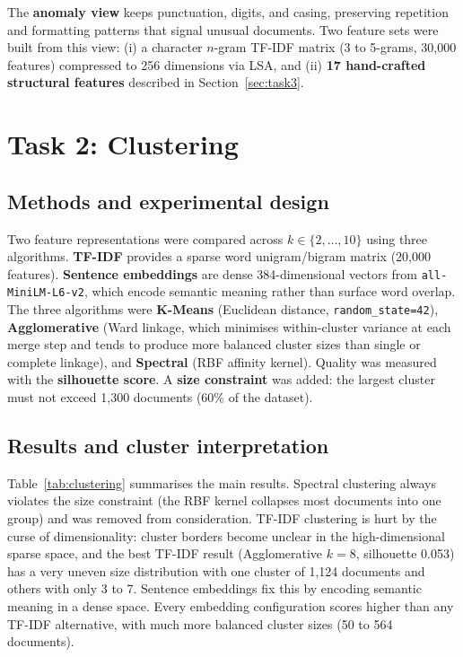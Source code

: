 \documentclass[11pt,a4paper]{article}
\begin{document}
The \textbf{anomaly view} keeps punctuation, digits, and casing, preserving repetition and formatting patterns that signal unusual documents. Two feature sets were built from this view: (i) a character $n$-gram TF-IDF matrix (3 to 5-grams, 30,000 features) compressed to 256 dimensions via LSA, and (ii) \textbf{17 hand-crafted structural features} described in Section~\ref{sec:task3}.

\section{Task 2: Clustering}
\label{sec:task2}

\subsection{Methods and experimental design}

Two feature representations were compared across $k \in \{2, \ldots, 10\}$ using three algorithms. \textbf{TF-IDF} provides a sparse word unigram/bigram matrix (20,000 features). \textbf{Sentence embeddings} are dense 384-dimensional vectors from \texttt{all-MiniLM-L6-v2}, which encode semantic meaning rather than surface word overlap. The three algorithms were \textbf{K-Means} (Euclidean distance, \texttt{random\_state=42}), \textbf{Agglomerative} (Ward linkage, which minimises within-cluster variance at each merge step and tends to produce more balanced cluster sizes than single or complete linkage), and \textbf{Spectral} (RBF affinity kernel). Quality was measured with the \textbf{silhouette score}. A \textbf{size constraint} was added: the largest cluster must not exceed 1,300 documents (60\% of the dataset).

\subsection{Results and cluster interpretation}

Table~\ref{tab:clustering} summarises the main results. Spectral clustering always violates the size constraint (the RBF kernel collapses most documents into one group) and was removed from consideration. TF-IDF clustering is hurt by the curse of dimensionality: cluster borders become unclear in the high-dimensional sparse space, and the best TF-IDF result (Agglomerative $k=8$, silhouette 0.053) has a very uneven size distribution with one cluster of 1,124 documents and others with only 3 to 7. Sentence embeddings fix this by encoding semantic meaning in a dense space. Every embedding configuration scores higher than any TF-IDF alternative, with much more balanced cluster sizes (50 to 564 documents).
\end{document}
